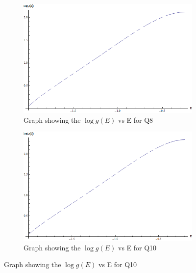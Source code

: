 \begin{figure}[H]
\begin{subfigure}[b]{0.45\textwidth}
    \includegraphics[width=\textwidth]{7-Appendices/Q8Log(rho(E)).png}
    \caption{Graph showing the $\log{g\left(E\right)}$ vs E for Q8}
\end{subfigure}
\begin{subfigure}[b]{0.45\textwidth}
    \includegraphics[width=\textwidth]{7-Appendices/Q10Log(rho(E)).png}
    \caption{Graph showing the $\log{g\left(E\right)}$ vs E for Q10}
\end{subfigure}
\end{figure}

